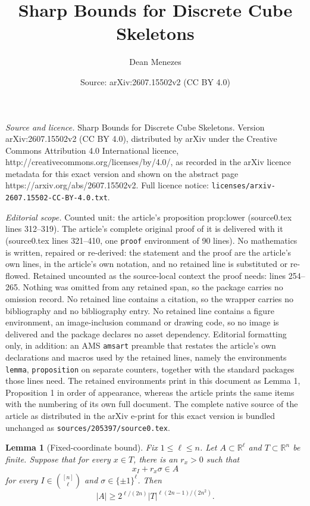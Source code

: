 \documentclass[10pt,a4paper]{amsart}
\title{Sharp Bounds for Discrete Cube Skeletons}
\author{Dean Menezes}
\date{Source: arXiv:2607.15502v2 (CC BY 4.0)}
\newtheorem{lemma}{Lemma}
\newcommand{\R}{\mathbb{R}}
\begin{document}
\maketitle

\noindent\emph{Source and licence.} Sharp Bounds for Discrete Cube Skeletons. Version arXiv:2607.15502v2 (CC BY 4.0), distributed by arXiv under the Creative Commons Attribution 4.0 International licence, http://creativecommons.org/licenses/by/4.0/, as recorded in the arXiv licence metadata for this exact version and shown on the abstract page https://arxiv.org/abs/2607.15502v2. Full licence notice: \texttt{licenses/arxiv-2607.15502-CC-BY-4.0.txt}.\par\smallskip

\noindent\textit{Editorial scope.} Counted unit: the article's proposition prop:lower (source0.tex lines 312--319). The article's complete original proof of it is delivered with it (source0.tex lines 321--410, one \texttt{proof} environment of 90 lines). No mathematics is written, repaired or re-derived: the statement and the proof are the article's own lines, in the article's own notation, and no retained line is substituted or re-flowed.  Retained uncounted as the source-local context the proof needs: lines 254--265.  Nothing was omitted from any retained span, so the package carries no omission record.  No retained line contains a citation, so the wrapper carries no bibliography and no bibliography entry.  No retained line contains a figure environment, an image-inclusion command or drawing code, so no image is delivered and the package declares no asset dependency.  Editorial formatting only, in addition: an AMS \texttt{amsart} preamble that restates the article's own declarations and macros used by the retained lines, namely the environments \texttt{lemma}, \texttt{proposition} on separate counters, together with the standard packages those lines need.  The retained environments print in this document as Lemma 1, Proposition 1 in order of appearance, whereas the article prints the same items with the numbering of its own full document.  The complete native source of the article as distributed in the arXiv e-print for this exact version is bundled unchanged as \texttt{sources/205397/source0.tex}.
\begin{lemma}[Fixed-coordinate bound]\label{lem:fixed}
Fix $1\leq\ell\leq n$.  Let $A\subset\R^\ell$ and $T\subset\R^n$ be finite.
Suppose that for every $x\in T$, there is an $r_x>0$ such that
\[
 x_I+r_x\sigma\in A
\]
for every $I\in\binom{[n]}{\ell}$ and $\sigma\in\{\pm1\}^\ell$.  Then
\[
 |A|\geq
 2^{\ell/(2n)}|T|^{\ell(2n-1)/(2n^2)}.
\]
\end{lemma}
\end{document}
